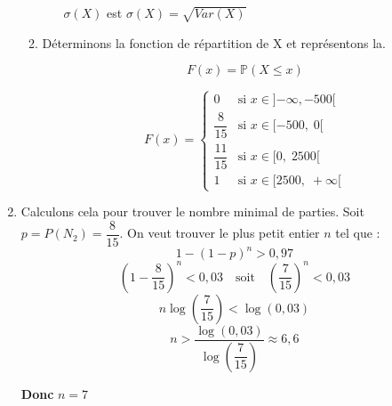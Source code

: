 \documentclass[12pt,a4paper]{article}
\begin{document}
\begin{enumerate}
\begin{enumerate}
\begin{itemize}
$\sigma(X)$ est $\sigma(X) = \sqrt{Var(X)}$
    \end{itemize}
    \item Déterminons la fonction de répartition de X et représentons la.

\[
F(x) = \mathbb{P}(X \leq x)
\]

\[
F(x) =
\begin{cases}
0 & \text{si } x \in ]{-\infty}, -500[ \\
\dfrac{8}{15} & \text{si } x \in [-500,\; 0[ \\
\dfrac{11}{15} & \text{si } x \in [0,\; 2500[ \\
1 & \text{si } x \in [2500,\; +\infty[
\end{cases}
\]


\end{enumerate}
\item Calculons cela pour trouver le nombre minimal de parties.
Soit \( p = P(N_2) = \dfrac{8}{15} \). On veut trouver le plus petit entier \( n \) tel que :
\[
1 - (1 - p)^n > 0{,}97
\]
\[
(1 - \dfrac{8}{15})^n < 0{,}03 \quad \text{soit} \quad \left( \dfrac{7}{15} \right)^n < 0{,}03
\]
\[
n \log\left( \dfrac{7}{15} \right) < \log(0{,}03)
\]
\[
n > \dfrac{\log(0{,}03)}{\log\left( \dfrac{7}{15} \right)} \approx 6{,}6
\]

\textbf{Donc } \( n = 7 \)

\end{enumerate}
\end{document}
